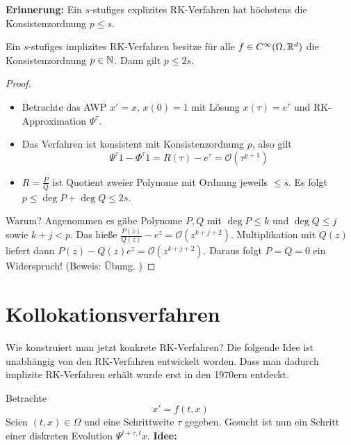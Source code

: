 \textbf{Erinnerung:} Ein $s$-stufiges explizites RK-Verfahren hat höchstens die Konsistenzordnung $p \le s$.
\begin{lemma}
	Ein $s$-stufiges implizites RK-Verfahren besitze für alle $f \in C^\infty(\Omega, \mathbb R^d)$ die Konsistenzordnung $p \in \mathbb N$. Dann gilt $ p \le 2s$.
\end{lemma}
\begin{proof}
	\begin{itemize}
		\item Betrachte das AWP $x' = x$, $x(0) =1$ mit Lösung $x(\tau) = e^{\tau}$ und RK-Approximation $\Psi^\tau$.
		\item Das Verfahren ist konsistent mit Konsistenzordnung $p$, also gilt
		\begin{equation*}
			\Psi^\tau 1 - \Phi^\tau 1 = R(\tau) - e^\tau = \mathcal O(\tau^{p+1})
		\end{equation*}
		\item $R = \frac{P}{Q}$ ist Quotient zweier Polynome mit Ordnung jeweils $\le s$. Es folgt $p \le \deg P + \deg Q \le 2s$.
	\end{itemize}
	Warum? Angenommen es gäbe Polynome $P, Q$ mit $\deg P \le k$ und $\deg Q \le j$ sowie $k+j < p$. Das hieße $\frac{P(z)}{Q(z)} - e^z = \mathcal O(z^{k+j+2})$. Multiplikation mit $Q(z)$liefert dann $P(z) - Q(z) e^z =  \mathcal O(z^{k+j+2})$. Daraus folgt $P = Q = 0$ ein Widerspruch!
	(Beweis: Übung. \cite[Lemma~6.4]{deuflhard_bornemann:2008})
\end{proof}


\section{Kollokationsverfahren}

Wie konstruiert man jetzt konkrete RK-Verfahren?
Die folgende Idee ist unabhängig von den RK-Verfahren entwickelt worden.
Dass man dadurch implizite RK-Verfahren erhält wurde erst in den 1970ern entdeckt.

Betrachte 
\begin{equation*}
	x' = f(t,x)
\end{equation*}
Seien $(t,x) \in \Omega$ und eine Schrittweite $\tau$ gegeben. Gesucht ist nun ein Schritt einer diskreten Evolution $\Psi^{t + \tau, t} x$.
\textbf{Idee:}

